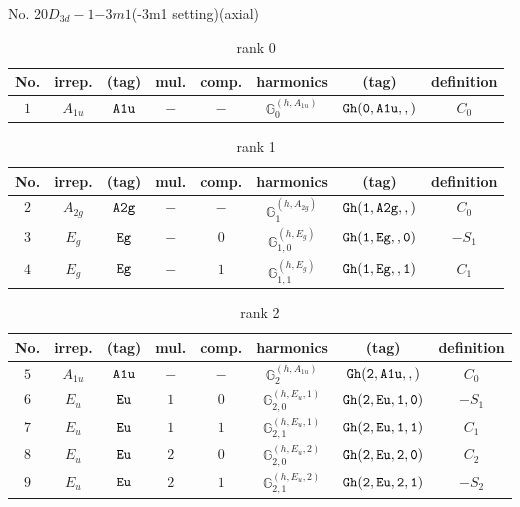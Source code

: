 \documentclass[fleqn,8pt]{jsarticle}
\begin{document}
\setcounter{MaxMatrixCols}{16}

\begin{center}
\LARGE
No. 20\quad$D_{3d}-1$\quad$-3m1$\quad(-3m1 setting)\quad[ trigonal ] (axial)
\end{center}
\begin{table}[ht!]
\begin{center}
\caption{rank 0}
\renewcommand{\arraystretch}{1.3}
\begin{tabular}{cccccccc} \hline \hline
No. & irrep. & (tag) & mul. & comp. & harmonics & (tag) & definition \\ \hline
$ 1 $ & $ A_{1u} $ & $ {\tt A1u} $ & $ - $ & $ - $ & $ \mathbb{G}_{0}^{(h,A_{1u})} $ & $ {\tt Gh(0,A1u,,)} $ & $ C_{0} $ \\
 \hline \hline
\end{tabular}
\end{center}
\end{table}
\begin{table}[ht!]
\begin{center}
\caption{rank 1}
\renewcommand{\arraystretch}{1.3}
\begin{tabular}{cccccccc} \hline \hline
No. & irrep. & (tag) & mul. & comp. & harmonics & (tag) & definition \\ \hline
$ 2 $ & $ A_{2g} $ & $ {\tt A2g} $ & $ - $ & $ - $ & $ \mathbb{G}_{1}^{(h,A_{2g})} $ & $ {\tt Gh(1,A2g,,)} $ & $ C_{0} $ \\
$ 3 $ & $ E_{g} $ & $ {\tt Eg} $ & $ - $ & $ 0 $ & $ \mathbb{G}_{1,0}^{(h,E_{g})} $ & $ {\tt Gh(1,Eg,,0)} $ & $ - S_{1} $ \\
$ 4 $ & $ E_{g} $ & $ {\tt Eg} $ & $ - $ & $ 1 $ & $ \mathbb{G}_{1,1}^{(h,E_{g})} $ & $ {\tt Gh(1,Eg,,1)} $ & $ C_{1} $ \\
 \hline \hline
\end{tabular}
\end{center}
\end{table}
\begin{table}[ht!]
\begin{center}
\caption{rank 2}
\renewcommand{\arraystretch}{1.3}
\begin{tabular}{cccccccc} \hline \hline
No. & irrep. & (tag) & mul. & comp. & harmonics & (tag) & definition \\ \hline
$ 5 $ & $ A_{1u} $ & $ {\tt A1u} $ & $ - $ & $ - $ & $ \mathbb{G}_{2}^{(h,A_{1u})} $ & $ {\tt Gh(2,A1u,,)} $ & $ C_{0} $ \\
$ 6 $ & $ E_{u} $ & $ {\tt Eu} $ & $ 1 $ & $ 0 $ & $ \mathbb{G}_{2,0}^{(h,E_{u},1)} $ & $ {\tt Gh(2,Eu,1,0)} $ & $ - S_{1} $ \\
$ 7 $ & $ E_{u} $ & $ {\tt Eu} $ & $ 1 $ & $ 1 $ & $ \mathbb{G}_{2,1}^{(h,E_{u},1)} $ & $ {\tt Gh(2,Eu,1,1)} $ & $ C_{1} $ \\
$ 8 $ & $ E_{u} $ & $ {\tt Eu} $ & $ 2 $ & $ 0 $ & $ \mathbb{G}_{2,0}^{(h,E_{u},2)} $ & $ {\tt Gh(2,Eu,2,0)} $ & $ C_{2} $ \\
$ 9 $ & $ E_{u} $ & $ {\tt Eu} $ & $ 2 $ & $ 1 $ & $ \mathbb{G}_{2,1}^{(h,E_{u},2)} $ & $ {\tt Gh(2,Eu,2,1)} $ & $ - S_{2} $ \\
 \hline \hline
\end{tabular}
\end{center}
\end{table}
\end{document}

